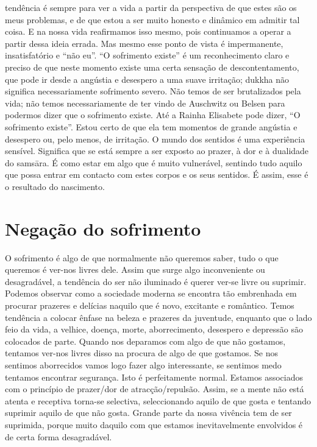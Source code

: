 tendência é sempre para ver a vida a partir da perspectiva de
que estes são os meus problemas, e de que estou a ser muito
honesto e dinâmico em admitir tal coisa. E na nossa vida
reafirmamos isso mesmo, pois continuamos a operar a partir
dessa ideia errada. Mas mesmo esse ponto de vista é impermanente, insatisfatório e “não eu”.
“O sofrimento existe” é um reconhecimento claro e preciso
de que neste momento existe uma certa sensação de descontentamento, que pode ir desde a angústia e desespero a uma
suave irritação; dukkha não significa necessariamente sofrimento severo. Não temos de ser brutalizados pela vida; não
temos necessariamente de ter vindo de Auschwitz ou Belsen
para podermos dizer que o sofrimento existe. Até a Rainha
Elisabete pode dizer, “O sofrimento existe”. Estou certo de
que ela tem momentos de grande angústia e desespero ou,
pelo menos, de irritação.
O mundo dos sentidos é uma experiência sensível.
Significa que se está sempre a ser exposto ao prazer, à dor e
à dualidade do samsāra. É como estar em algo que é muito
vulnerável, sentindo tudo aquilo que possa entrar em contacto com estes corpos e os seus sentidos. É assim, esse é o resultado do nascimento.

\section{Negação do sofrimento}

O sofrimento é algo de que normalmente não queremos
saber, tudo o que queremos é ver-nos livres dele. Assim que
surge algo inconveniente ou desagradável, a tendência do ser
não iluminado é querer ver-se livre ou suprimir. Podemos
observar como a sociedade moderna se encontra tão embrenhada em procurar prazeres e delícias naquilo que é novo,
excitante e romântico. Temos tendência a colocar ênfase na
beleza e prazeres da juventude, enquanto que o lado feio da
vida, a velhice, doença, morte, aborrecimento, desespero e
depressão são colocados de parte. Quando nos deparamos
com algo de que não gostamos, tentamos ver-nos livres disso
na procura de algo de que gostamos. Se nos sentimos
aborrecidos vamos logo fazer algo interessante, se sentimos
medo tentamos encontrar segurança. Isto é perfeitamente
normal. Estamos associados com o princípio de prazer/dor de
atracção/repulsão. Assim, se a mente não está atenta e receptiva torna-se selectiva, seleccionando aquilo de que gosta
e tentando suprimir aquilo de que não gosta. Grande parte da
nossa vivência tem de ser suprimida, porque muito daquilo
com que estamos inevitavelmente envolvidos é de certa
forma desagradável.

